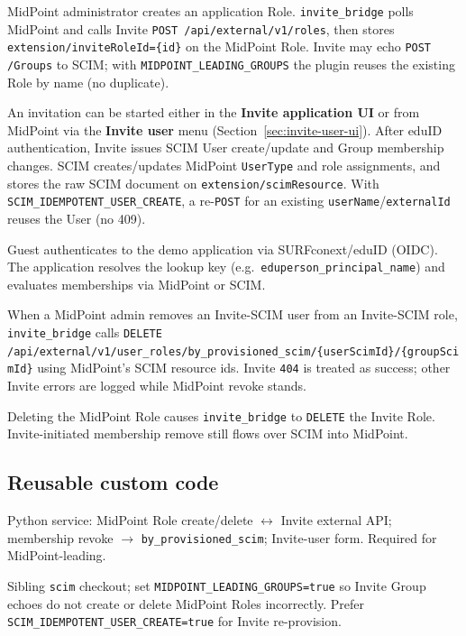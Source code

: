 \documentclass[11pt,a4paper]{article}
\begin{document}
\begin{description}[style=nextline,leftmargin=1.2em]
  \item[1. Create role (MidPoint-leading)]
    MidPoint administrator creates an application Role.
    \texttt{invite\_bridge} polls MidPoint and calls Invite
    \texttt{POST /api/external/v1/roles}, then stores
    \texttt{extension/inviteRoleId=\{id\}} on the MidPoint Role.
    Invite may echo \texttt{POST /Groups} to SCIM; with
    \texttt{MIDPOINT\_LEADING\_GROUPS} the plugin reuses the existing Role by
    name (no duplicate).
  \item[2. Invite and accept]
    An invitation can be started either in the \textbf{Invite application UI} or
    from MidPoint via the \textbf{Invite user} menu (Section~\ref{sec:invite-user-ui}).
    After eduID authentication, Invite issues SCIM User create/update and Group
    membership changes. SCIM creates/updates MidPoint \texttt{UserType} and role
    assignments, and stores the raw SCIM document on
    \texttt{extension/scimResource}.
    With \texttt{SCIM\_IDEMPOTENT\_USER\_CREATE}, a re-\texttt{POST} for an
    existing \texttt{userName}/\texttt{externalId} reuses the User (no 409).
  \item[3. Application sign-in]
    Guest authenticates to the demo application via SURFconext/eduID (OIDC).
    The application resolves the lookup key (e.g.\
    \texttt{eduperson\_principal\_name}) and evaluates memberships via MidPoint
    or SCIM.
  \item[4. Unassign member (drift prevention)]
    When a MidPoint admin removes an Invite-SCIM user from an Invite-SCIM role,
    \texttt{invite\_bridge} calls
    \texttt{DELETE /api/external/v1/user\_roles/by\_provisioned\_scim/\{userScimId\}/\{groupScimId\}}
    using MidPoint's SCIM resource ids. Invite \texttt{404} is treated as
    success; other Invite errors are logged while MidPoint revoke stands.
  \item[5. Delete role]
    Deleting the MidPoint Role causes \texttt{invite\_bridge} to
    \texttt{DELETE} the Invite Role. Invite-initiated membership remove still
    flows over SCIM into MidPoint.
\end{description}

\subsection{Reusable custom code}

\begin{description}[style=nextline,leftmargin=1.2em]
  \item[\texttt{invite\_bridge/}]
    Python service: MidPoint Role create/delete $\leftrightarrow$ Invite
    external API; membership revoke $\rightarrow$
    \texttt{by\_provisioned\_scim}; Invite-user form. Required for
    MidPoint-leading.
  \item[SCIM MidPoint plugin]
    Sibling \texttt{scim} checkout; set \texttt{MIDPOINT\_LEADING\_GROUPS=true}
    so Invite Group echoes do not create or delete MidPoint Roles incorrectly.
    Prefer \texttt{SCIM\_IDEMPOTENT\_USER\_CREATE=true} for Invite re-provision.
\end{description}
\end{document}
